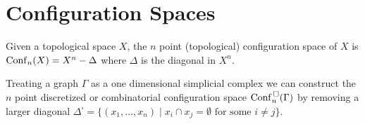 \chapter{Configuration Spaces}
Given a topological space \(X\), the \(n\) point (topological) configuration space of \(X\) is
\(\mathrm{Conf}_n(X) = X^n - \Delta\) where \(\Delta\) is the diagonal in \(X^n\).


Treating a graph \(\Gamma\) as a one dimensional simplicial complex we can construct the
\(n\) point discretized or combinatorial configuration space \(\mathrm{Conf}^{\,\square}_n(\Gamma)\) by 
removing a larger diagonal \(\Delta^{\square} = \{(x_1, \ldots, x_n) \mid x_i \cap x_j = \emptyset \text{ for some } i \neq j\}\).

